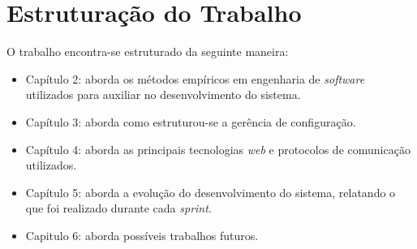 \section{Estruturação do Trabalho}
O trabalho encontra-se estruturado da seguinte maneira:

\begin{itemize}
    \item Capítulo 2: aborda os métodos empíricos em engenharia de \textit{software} utilizados para
    auxiliar no desenvolvimento do sistema.
    \item Capítulo 3: aborda como estruturou-se a gerência de configuração.
    \item Capítulo 4: aborda as principais tecnologias \textit{web} e protocolos de comunicação utilizados.
    \item Capítulo 5: aborda a evolução do desenvolvimento do sistema, relatando o que foi realizado durante cada \textit{sprint}.
    \item Capitulo 6: aborda possíveis trabalhos futuros.
\end{itemize}